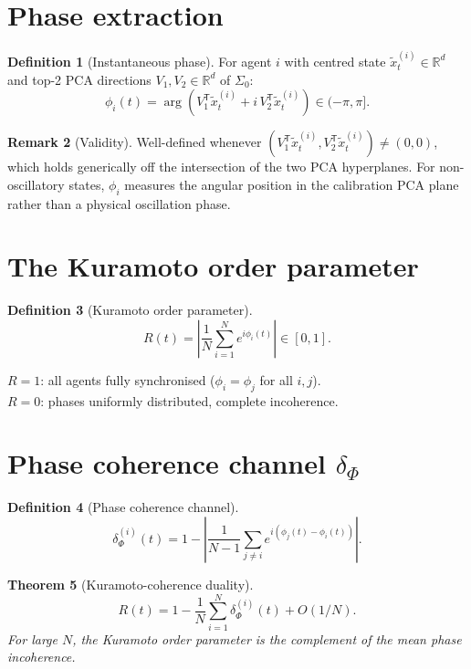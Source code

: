 \documentclass[11pt,a4paper,openany]{book}
\newtheorem{theorem}{Theorem}[chapter]
\theoremstyle{definition}
\newtheorem{definition}[theorem]{Definition}
\newtheorem{remark}[theorem]{Remark}
\newcommand{\R}{\mathbb{R}}
\newcommand{\T}{^{\mathsf{T}}}
\begin{document}
\section{Phase extraction}

\begin{definition}[Instantaneous phase]
For agent $i$ with centred state $\tilde x_t^{(i)} \in \R^d$ and top-2 PCA directions
$V_1, V_2 \in \R^d$ of $\Sigma_0$:
\[
\phi_i(t) = \arg\!\left(V_1\T\tilde x_t^{(i)} + i\,V_2\T\tilde x_t^{(i)}\right) \in (-\pi, \pi].
\]
\end{definition}

\begin{remark}[Validity]
Well-defined whenever $(V_1\T\tilde x_t^{(i)}, V_2\T\tilde x_t^{(i)}) \neq (0,0)$,
which holds generically off the intersection of the two PCA hyperplanes.
For non-oscillatory states, $\phi_i$ measures the angular position in the calibration PCA plane
rather than a physical oscillation phase.
\end{remark}

\section{The Kuramoto order parameter}

\begin{definition}[Kuramoto order parameter]
\[
R(t) = \left|\frac{1}{N}\sum_{i=1}^N e^{i\phi_i(t)}\right| \in [0,1].
\]
\end{definition}

$R = 1$: all agents fully synchronised ($\phi_i = \phi_j$ for all $i,j$).\\
$R = 0$: phases uniformly distributed, complete incoherence.

\section{Phase coherence channel $\delta_\Phi$}

\begin{definition}[Phase coherence channel]
\[
\delta_\Phi^{(i)}(t) = 1 - \left|\frac{1}{N-1}\sum_{j\neq i} e^{i(\phi_j(t)-\phi_i(t))}\right|.
\]
\end{definition}

\begin{theorem}[Kuramoto-coherence duality]
\[
R(t) = 1 - \frac{1}{N}\sum_{i=1}^N \delta_\Phi^{(i)}(t) + O(1/N).
\]
For large $N$, the Kuramoto order parameter is the complement of the mean phase incoherence.
\end{theorem}
\end{document}
